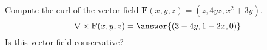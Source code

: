 \begin{problem}
Compute the curl of the vector field $\mathbf{F}(x,y,z) = (z,4yz,x^2+3y)$.
\[
\nabla\times\mathbf{F}(x,y,z) = \answer{(3-4y,1-2x,0)}
\]
Is this vector field conservative?
\begin{multipleChoice}
\end{multipleChoice}
\end{problem}